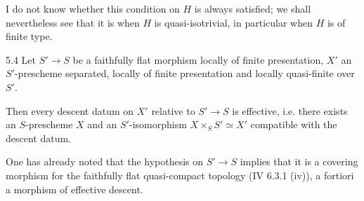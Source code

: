 I do not know whether this condition on $H$ is always satisfied; we shall nevertheless see that it is when $H$ is quasi-isotrivial, in particular when $H$ is of finite type.
\begin{lemma}{5.4}\label{X.5.4}
Let $S'\to S$ be a faithfully flat morphism locally of finite presentation, $X'$ an $S'$-prescheme separated, locally of finite presentation and locally quasi-finite over $S'$.

Then every descent datum on $X'$ relative to $S'\to S$ is effective, i.e. there exists an $S$-prescheme $X$ and an $S'$-isomorphism $X\times_S S'\simeq X'$ compatible with the descent datum.
\end{lemma}
One has already noted that the hypothesis on $S'\to S$ implies that it is a covering morphism for the faithfully flat quasi-compact topology (IV 6.3.1 (iv)), a fortiori a morphism of effective descent.

